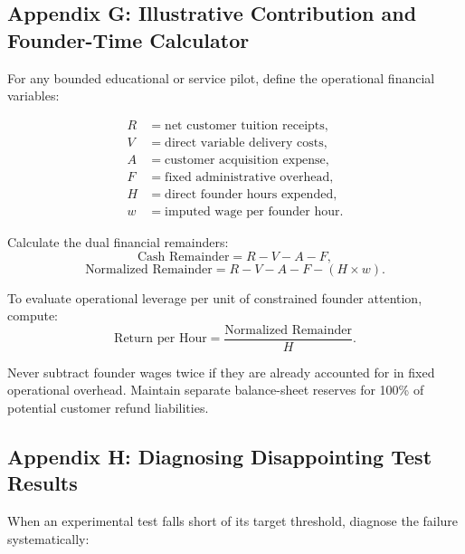 \subsection*{Appendix G: Illustrative Contribution and Founder-Time Calculator}

For any bounded educational or service pilot, define the operational financial variables:

\begin{equation}
\begin{aligned}
R &= \text{net customer tuition receipts}, \\
V &= \text{direct variable delivery costs}, \\
A &= \text{customer acquisition expense}, \\
F &= \text{fixed administrative overhead}, \\
H &= \text{direct founder hours expended}, \\
w &= \text{imputed wage per founder hour}.
\end{aligned}
\end{equation}

Calculate the dual financial remainders:
\begin{equation}
\text{Cash Remainder} = R - V - A - F,
\end{equation}
\begin{equation}
\text{Normalized Remainder} = R - V - A - F - (H \times w).
\end{equation}

To evaluate operational leverage per unit of constrained founder attention, compute:
\begin{equation}
\text{Return per Hour} = \frac{\text{Normalized Remainder}}{H}.
\end{equation}

Never subtract founder wages twice if they are already accounted for in fixed operational overhead. Maintain separate balance-sheet reserves for 100\% of potential customer refund liabilities.

\subsection*{Appendix H: Diagnosing Disappointing Test Results}

When an experimental test falls short of its target threshold, diagnose the failure systematically:

